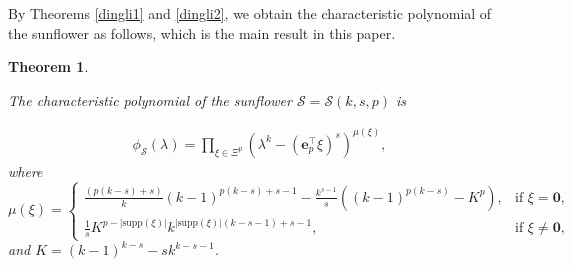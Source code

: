 \documentclass{article}
\newtheorem{thm}{Theorem}[section]
\begin{document}
By Theorems \ref{dingli1} and \ref{dingli2},
we obtain the characteristic polynomial of the sunflower as follows,
which is the main result in this paper.

\begin{thm}\label{mainresult}

The characteristic polynomial of the sunflower $\mathcal{S}=\mathcal{S}(k,s,p)$ is

\begin{align*}
\phi_{\mathcal{S}}(\lambda)=\prod_{\xi\in\Xi^{p}}(\lambda^{k}-(\mathbf{e}_{p}^{\top}\xi)^{s})^{\mu(\xi)},
\end{align*}
where
\begin{equation*}
\mu(\xi)=\begin{cases}
\frac{(p(k-s)+s)}{k}(k-1)^{p(k-s)+s-1}-\frac{k^{s-1}}{s}((k-1)^{p(k-s)}-K^{p}),
&\text{if $\xi=\mathbf{0}$},\\
\frac{1}{s}K^{p-|\mathrm{supp}(\xi)|}k^{|\mathrm{supp}(\xi)|(k-s-1)+s-1},
&\text{if $\xi\neq\mathbf{0}$},
\end{cases}
\end{equation*}
and $K=(k-1)^{k-s}-sk^{k-s-1}$.

\end{thm}
\end{document}
